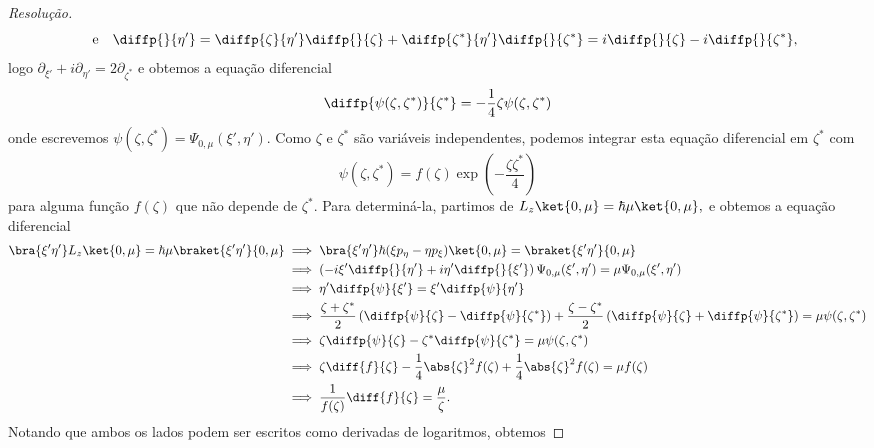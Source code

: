 \begin{proof}[Resolução]
\begin{equation*}
      \quad\text{e}\quad
      \diffp{}{\eta'} = \diffp{\zeta}{\eta'} \diffp{}{\zeta} + \diffp{\zeta^*}{\eta'} \diffp{}{\zeta^*} = i\diffp{}{\zeta} - i\diffp{}{\zeta^*},
   \end{equation*}
   logo \(\partial_{\xi'} + i \partial_{\eta'} = 2 \partial_{\zeta^*}\) e obtemos a equação diferencial
   \begin{equation*}
      \diffp{\psi(\zeta, \zeta^*)}{\zeta^*} = -\frac14 \zeta \psi(\zeta, \zeta^*)
   \end{equation*}
   onde escrevemos \(\psi(\zeta,\zeta^*) = \Psi_{0,\mu}(\xi', \eta').\) Como \(\zeta\) e \(\zeta^*\) são variáveis independentes, podemos integrar esta equação diferencial em \(\zeta^*\) com
   \begin{equation*}
      \psi(\zeta, \zeta^*) = f(\zeta)\exp\left(-\frac{\zeta \zeta^*}{4}\right)
   \end{equation*}
   para alguma função \(f(\zeta)\) que não depende de \(\zeta^*\). Para determiná-la, partimos de \(L_z \ket{0,\mu} = \hbar \mu\ket{0,\mu},\) e obtemos a equação diferencial
   \begin{align*}
      \bra{\xi'\eta'} L_z \ket{0,\mu} = \hbar \mu\braket{\xi'\eta'}{0,\mu} 
      &\implies \bra{\xi'\eta'}\hbar (\xi p_\eta - \eta p_\xi)\ket{0,\mu} = \braket{\xi'\eta'}{0,\mu}\\
      &\implies \left(-i\xi' \diffp{}{\eta'} + i\eta' \diffp{}{\xi'}\right)\Psi_{0,\mu}(\xi', \eta') = \mu \Psi_{0,\mu}(\xi', \eta')\\
                                        &\implies \eta' \diffp{\psi}{\xi'} = \xi' \diffp{\psi}{\eta'}\\
                                        &\implies \frac{\zeta + \zeta^*}{2}\left(\diffp{\psi}{\zeta} - \diffp{\psi}{\zeta^*}\right) + \frac{\zeta - \zeta^*}{2}\left(\diffp{\psi}{\zeta} + \diffp{\psi}{\zeta^*}\right) = \mu \psi(\zeta, \zeta^*)\\
                                        &\implies \zeta \diffp{\psi}{\zeta} - \zeta^* \diffp{\psi}{\zeta^*} = \mu \psi(\zeta, \zeta^*)\\
                                        &\implies \zeta \diff{f}{\zeta} - \frac14\abs{\zeta}^2 f(\zeta) + \frac14 \abs{\zeta}^2 f(\zeta) = \mu f(\zeta)\\
                                        &\implies \frac{1}{f(\zeta)} \diff{f}{\zeta} = \frac{\mu}{\zeta}.
   \end{align*}
   Notando que ambos os lados podem ser escritos como derivadas de logaritmos, obtemos

\end{proof}
